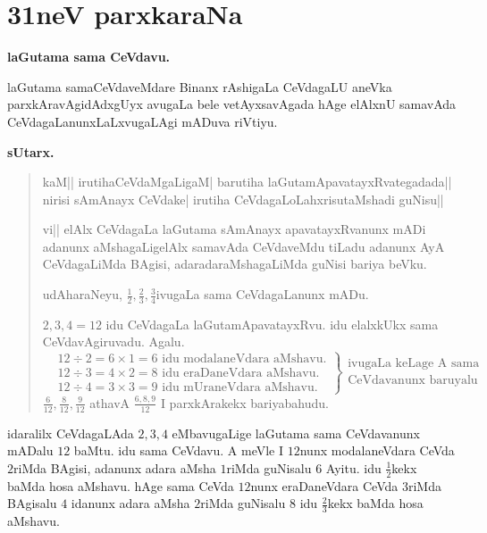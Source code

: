\chapter{31neV parxkaraNa}

\begin{center}
{\large\bf laGutama sama CeVdavu.}
\end{center}

laGutama samaCeVdaveMdare Binanx rAshigaLa CeVdagaLU aneVka parxkAravAgidAdxgUyx avugaLa bele vetAyxsavAgada hAge elAlxnU samavAda CeVdagaLanunxLaLxvugaLAgi mADuva riVtiyu.

\begin{center}
{\large\bf sUtarx.}
\end{center}

\begin{verse}
kaM|| irutihaCeVdaMgaLigaM| barutiha laGutamApavatayxRvategadada|| nirisi sAmAnayx CeVdake| irutiha CeVdagaLoLahxrisutaMshadi guNisu||

vi|| elAlx CeVdagaLa laGutama sAmAnayx apavatayxRvanunx mADi adanunx aMshagaLigelAlx samavAda CeVdaveMdu tiLadu adanunx AyA CeVdagaLiMda BAgisi, adaradaraMshagaLiMda guNisi bariya beVku.

udAharaNeyu, $\frac{1}{2}, \frac{2}{3}, \frac{3}{4}$ivugaLa sama CeVdagaLanunx mADu.

$2,3,4=12$ idu CeVdagaLa laGutamApavatayxRvu. idu elalxkUkx sama CeVdavAgiruvadu. Agalu.
\begin{equation*}
\left.
\begin{aligned}
& \text{$12\div2=6\times1=6$ idu modalaneVdara aMshavu.}\\
& \text{$12\div3=4\times2=8$ idu eraDaneVdara aMshavu.}\\
& \text{$12\div4=3\times3=9$ idu mUraneVdara aMshavu.}
\end{aligned}
\right\}
\begin{matrix}
\text{ivugaLa keLage A sama}\\
\text{CeVdavanunx baruyalu}
\end{matrix}
\end{equation*}
$\frac{6}{12},\frac{8}{12},\frac{9}{12}$ athavA $\frac{6,8,9}{12}$ I parxkArakekx bariyabahudu.
\end{verse}

idaralilx CeVdagaLAda $2, 3, 4$ eMbavugaLige laGutama sama CeVdavanunx mADalu $12$ baMtu. idu sama CeVdavu. A meVle I $12$nunx modalaneVdara CeVda $2$riMda BAgisi, adanunx adara aMsha $1$riMda guNisalu $6$ Ayitu. idu $\frac{1}{2}$kekx baMda hosa aMshavu. hAge sama CeVda $12$nunx eraDaneVdara CeVda $3$riMda BAgisalu $4$ idanunx adara aMsha $2$riMda guNisalu $8$ idu $\frac{2}{3}$kekx baMda hosa aMshavu.

